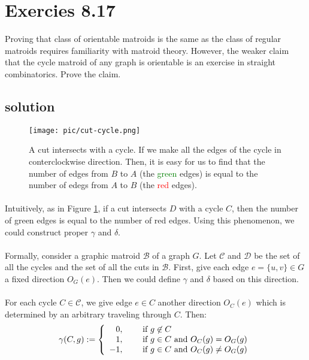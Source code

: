 \documentclass{article}
\begin{document}
\section{Exercies 8.17}
Proving that class of orientable matroids is the same as the class of regular matroids requires familiarity with matroid theory. However, the weaker claim that the cycle matroid of any graph is orientable is an exercise in straight combinatorics. Prove the claim.
\subsection{solution}
\begin{figure}[ht!]
  \centering
  \texttt{[image: pic/cut-cycle.png]}
  
  \caption{
    A cut intersects with a cycle.
    If we make all the edges of the cycle in conterclockwise direction.
    Then, it is easy for us to find that the number of edges from $B$ to $A$ (the \textcolor{green}{green} edges)
    is equal to the number of edegs from $A$ to $B$ (the \textcolor{red}{red} edges).
  }
  \label{fig:cut-cycle}
\end{figure}
\paragraph{}
Intuitively, as in Figure \ref{fig:cut-cycle}, if a cut intersects $D$ with a cycle $C$,
then the number of green edges is equal to the number of red edges.
Using this phenomenon, we could construct proper $\gamma$ and $\delta$.

\paragraph{}
Formally, consider a graphic matroid $\mathcal{B}$ of a graph $G$.
Let $\mathcal{C}$ and $\mathcal{D}$ be the set of all the cycles and the set of all the cuts in $\mathcal{B}$.
First, give each edge $e = \{u, v\} \in G$ a fixed direction $O_G(e)$.
Then we could define $\gamma$ and $\delta$ based on this direction.

\paragraph{}
For each cycle $C\in\mathcal{C}$,
we give edge $e\in C$ another direction $O_C(e)$ which is determined by an arbitrary traveling through $C$.
Then:
\begin{align}
  \label{align:C}
  \gamma(C, g) := \left\{
  \begin{array}{rl}
    0, \hspace{0.5cm} &\mbox{if $g\not\in C$} \\
    1, \hspace{0.5cm} &\mbox{if $g\in C$ and $O_C(g) = O_G(g)$} \\
    -1,\hspace{0.5cm} &\mbox{if $g\in C$ and $O_C(g)\not= O_G(g)$}
  \end{array}
  \right.
\end{align}
\end{document}
